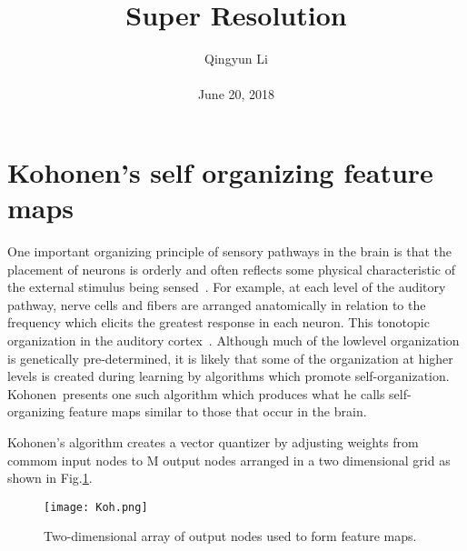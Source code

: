 \documentclass[10pt,twocolumn,letterpaper]{article}
\begin{document}
\author{Qingyun Li\\\\
June 20, 2018}        
\title{Super Resolution}

\maketitle

\section{Kohonen's self organizing feature maps}
\par One important organizing principle of sensory pathways in the brain is that the placement of neurons is orderly and often reflects some physical characteristic of the external stimulus being sensed~\cite{kandel2000principles}. For example, at each level of the auditory pathway, nerve cells and fibers are arranged anatomically in relation to the frequency which elicits the greatest response in each neuron. This tonotopic organization in the auditory cortex~\cite{kandel2000principles}. Although much of the lowlevel organization is genetically pre-determined, it is likely that some of the organization at higher levels is created during learning by algorithms which promote self-organization. Kohonen~\cite{Kohonen1984Self}presents one such algorithm which produces what he calls self-organizing feature maps similar to those that occur in the brain.
\par Kohonen's algorithm creates a vector quantizer by adjusting weights from commom input nodes to M output nodes arranged in a two dimensional grid as shown in Fig.\ref{17}. 
\begin{figure}[t]
 \centering{}
\texttt{[image: Koh.png]}\\
 \caption{Two-dimensional array of output nodes used to form feature maps.}
\label{17}
\end{figure}
 
 
\end{document}
